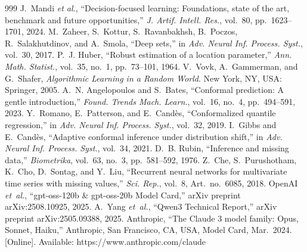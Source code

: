 \begin{thebibliography}{999}
 J.~Mandi \emph{et al.}, ``Decision-focused learning: Foundations, state of the art, benchmark and future opportunities,'' \emph{J. Artif. Intell. Res.}, vol.~80, pp.~1623--1701, 2024.
 M.~Zaheer, S.~Kottur, S.~Ravanbakhsh, B.~Poczos, R.~Salakhutdinov, and A.~Smola, ``Deep sets,'' in \emph{Adv. Neural Inf. Process. Syst.}, vol.~30, 2017.
 P.~J. Huber, ``Robust estimation of a location parameter,'' \emph{Ann. Math. Statist.}, vol.~35, no.~1, pp.~73--101, 1964.
 V.~Vovk, A.~Gammerman, and G.~Shafer, \emph{Algorithmic Learning in a Random World}. New York, NY, USA: Springer, 2005.
 A.~N. Angelopoulos and S.~Bates, ``Conformal prediction: A gentle introduction,'' \emph{Found. Trends Mach. Learn.}, vol.~16, no.~4, pp.~494--591, 2023.
 Y.~Romano, E.~Patterson, and E.~Cand\`{e}s, ``Conformalized quantile regression,'' in \emph{Adv. Neural Inf. Process. Syst.}, vol.~32, 2019.
 I.~Gibbs and E.~Cand\`{e}s, ``Adaptive conformal inference under distribution shift,'' in \emph{Adv. Neural Inf. Process. Syst.}, vol.~34, 2021.
 D.~B. Rubin, ``Inference and missing data,'' \emph{Biometrika}, vol.~63, no.~3, pp.~581--592, 1976.
 Z.~Che, S.~Purushotham, K.~Cho, D.~Sontag, and Y.~Liu, ``Recurrent neural networks for multivariate time series with missing values,'' \emph{Sci. Rep.}, vol.~8, Art.\ no.~6085, 2018.
 OpenAI \emph{et~al.}, ``gpt-oss-120b \& gpt-oss-20b Model Card,'' arXiv preprint arXiv:2508.10925, 2025.
 A.~Yang \emph{et~al.}, ``Qwen3 Technical Report,'' arXiv preprint arXiv:2505.09388, 2025.
 Anthropic, ``The Claude 3 model family: Opus, Sonnet, Haiku,'' Anthropic, San Francisco, CA, USA, Model Card, Mar.\ 2024. [Online]. Available: https://www.anthropic.com/claude
\end{thebibliography}
\endgroup
